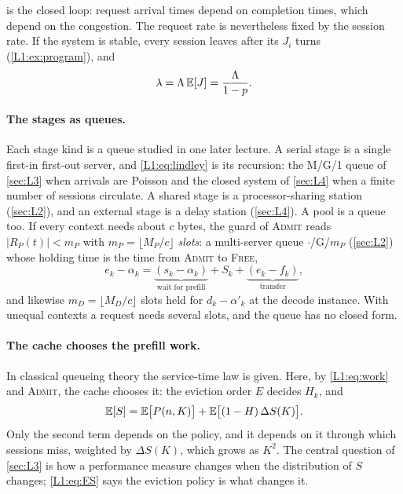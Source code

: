  is the closed loop: request arrival times depend on completion
times, which depend on the congestion. The request rate is nevertheless fixed by the
session rate. If the system is stable, every session leaves after its $J_i$ turns
(\cref{L1:ex:program}), and
\begin{equation}\label{L1:eq:turnrate}
  \lambda=\Lambda\,\mathbb{E}[J]=\frac{\Lambda}{1-p}.
\end{equation}

\paragraph{The stages as queues.} Each stage kind is a queue studied in one later
lecture. A serial stage is a single first-in first-out server, and
\eqref{L1:eq:lindley} is its recursion: the M/G/1 queue of \cref{sec:L3} when arrivals
are Poisson and the closed system of \cref{sec:L4} when a finite number of sessions
circulate. A shared stage is a processor-sharing station (\cref{sec:L2}), and an
external stage is a delay station (\cref{sec:L4}). A pool is a queue too. If every
context needs about $c$ bytes, the guard of \textsc{Admit} reads $|R_P(t)|<m_P$ with
$m_P=\lfloor M_P/c\rfloor$ \emph{slots}: a multi-server queue $\cdot$/G/$m_P$
(\cref{sec:L2}) whose holding time is the time from \textsc{Admit} to \textsc{Free},
\[
  e_k-\alpha_k={\underbrace{(s_k-\alpha_k)}_{\text{wait for prefill}}}+S_k
  +{\underbrace{(e_k-f_k)}_{\text{transfer}}},
\]
and likewise $m_D=\lfloor M_D/c\rfloor$ slots held for $d_k-\alpha'_k$ at the decode
instance. With unequal contexts a request needs several slots, and the queue has no
closed form.

\paragraph{The cache chooses the prefill work.} In classical queueing theory the
service-time law is given. Here, by \eqref{L1:eq:work} and \textsc{Admit}, the cache
chooses it: the eviction order $E$ decides $H_k$, and
\begin{equation}\label{L1:eq:ES}
  \mathbb{E}[S]=\mathbb{E}\bigl[P(n,K)\bigr]+\mathbb{E}\bigl[(1-H)\,\Delta S(K)\bigr].
\end{equation}
Only the second term depends on the policy, and it depends on it through which
sessions miss, weighted by $\Delta S(K)$, which grows as $K^2$. The central question of
\cref{sec:L3} is how a performance measure changes when the distribution of $S$
changes; \eqref{L1:eq:ES} says the eviction policy is what changes it.

